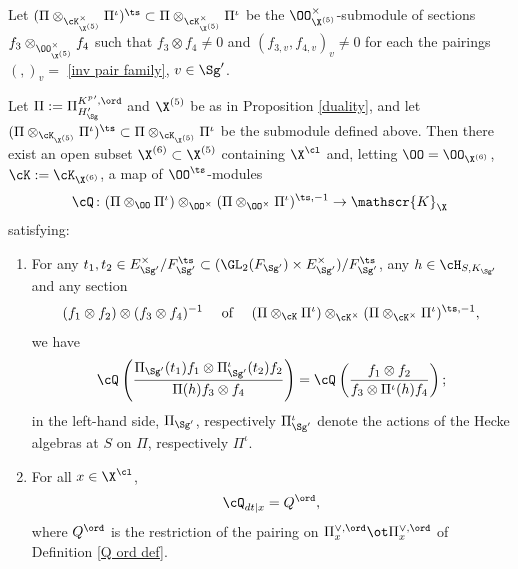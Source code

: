  Let
 $
 (\Pi\otimes_{\cK^{\times}_{\X^{(5)}}}\Pi^{\iota})^{\ts}
 \subset  \Pi\otimes_{\cK^{\times}_{\X^{(5)}}}\Pi^{\iota}$ be the
  $\OO_{\X^{(5)}}^{\times}$-submodule of sections $f_{3}\otimes_{\OO_{\X^{(5)}}^{\times}} f_{4}$ such that $f_{3}\otimes f_{4}\neq 0$ and $(f_{3,v},f_{4,v})_{v}\neq 0$ for each  the pairings $(, )_{v}=$ \eqref{inv pair family}, $v\in \Sg'$.






 \begin{theo} \label{X6} Let $\Pi:=\Pi_{{H_{\Sg}'}}^{K^{p}{}', \ord}$ and $\X^{(5)}$ be as in Proposition \ref{duality}, and let
 $
 (\Pi\otimes_{\cK_{\X^{(5)}}}\Pi^{\iota})^{\ts}
 \subset  \Pi\otimes_{\cK_{\X^{(5)}}}\Pi^{\iota}$ be the submodule defined above.
 Then there exist an open subset $\X^{(6)}\subset \X^{(5)}$ containing $\X^{\cl}$ and, letting  $\OO=\OO_{\X^{(6)}}$, $\cK:=\cK_{\X^{(6)}}$, a map of $\OO^{\ts}$-modules
$$\cQ^{} \colon
(\Pi\otimes_{\OO}\Pi^{\iota})\otimes_{\OO^{\times}}  ({\Pi} \otimes_{\OO^{\times}} {\Pi}^{\iota})^{\ts, -1}
 \to \mathscr{K}_{\X}$$
satisfying:
\begin{enumerate}\item
For any $t_{1}, t_{2}\in E_{\Sg'}^{\times}/F_{\Sg'}^{\ts}\subset (\GL_{2}(F_{\Sg'})\times E_{\Sg'}^{\times})/F_{\Sg'}^{\ts}$, any $h\in \cH_{S, K_{\Sg'}}$
and any section
$$(f_{1}\otimes f_{2}) \otimes  (f_{3}\otimes f_{4})^{-1} \quad
\text{ of }
\quad
( \Pi\otimes_{\cK} \Pi^{\iota})\otimes_{\cK^{\times}}  ({\Pi} \otimes_{\cK^{\times}} {\Pi}^{\iota})^{\ts, -1}, $$
 we have
$$\cQ^{}\left({\Pi_{\Sg'}(t_{1})f_{1} \otimes \Pi_{\Sg'}^{\iota}(t_{2})f_{2} \over \Pi( h)f_{3} \otimes f_{4}}\right)=
  \cQ^{}\left({ f_{1}\otimes f_{2} \over f_{3} \otimes \Pi^{\iota}(h)f_{4}}\right);$$
 in the left-hand side, $\Pi_{\Sg'}$, respectively $\Pi_{\Sg'}^{\iota}$ denote the actions of the Hecke algebras at $S$ on  $\Pi$, respectively $ \Pi^{\iota}$.
\item For all $x\in \X^{\cl}$,  $$\cQ^{}_{dt |x}=Q^{\ord}, $$  where $Q_{}^{\ord}$  is the restriction of the pairing on $\Pi_{x}^{\vee, \ord}\ot \Pi_{x}^{\vee,\ord}$ of Definition \ref{Q ord def}.
\end{enumerate}
\end{theo}

